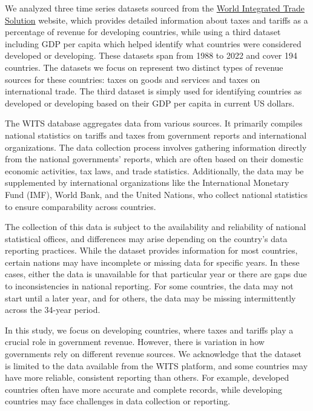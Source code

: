 \documentclass[12pt]{article}
\begin{document}
We analyzed three time series datasets sourced from the \href{https://wits.worldbank.org/CountryProfile/en/Country/BY-COUNTRY/StartYear/1988/EndYear/2022/Indicator/GC-TAX-GSRV-VA-ZS}{World Integrated Trade Solution} website, which provides detailed information about taxes and tariffs as a percentage of revenue for developing countries, while using a third dataset including GDP per capita which helped identify what countries were considered developed or developing. These datasets span from 1988 to 2022 and cover 194 countries. The datasets we focus on represent two distinct types of revenue sources for these countries: taxes on goods and services and taxes on international trade. The third dataset is simply used for identifying countries as developed or developing based on their GDP per capita in current US dollars. 

The WITS database aggregates data from various sources. It primarily compiles national statistics on tariffs and taxes from government reports and international organizations. The data collection process involves gathering information directly from the national governments' reports, which are often based on their domestic economic activities, tax laws, and trade statistics. Additionally, the data may be supplemented by international organizations like the International Monetary Fund (IMF), World Bank, and the United Nations, who collect national statistics to ensure comparability across countries.

The collection of this data is subject to the availability and reliability of national statistical offices, and differences may arise depending on the country’s data reporting practices. While the dataset provides information for most countries, certain nations may have incomplete or missing data for specific years. In these cases, either the data is unavailable for that particular year or there are gaps due to inconsistencies in national reporting. For some countries, the data may not start until a later year, and for others, the data may be missing intermittently across the 34-year period.

In this study, we focus on developing countries, where taxes and tariffs play a crucial role in government revenue. However, there is variation in how governments rely on different revenue sources. We acknowledge that the dataset is limited to the data available from the WITS platform, and some countries may have more reliable, consistent reporting than others. For example, developed countries often have more accurate and complete records, while developing countries may face challenges in data collection or reporting.
\end{document}
